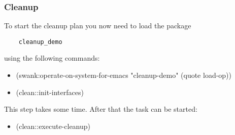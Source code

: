 \documentclass[main.tex]{subfiles}
\begin{document}
	\subsubsection{Cleanup}
	To start the cleanup plan you now need to load the package \begin{verbatim}
	cleanup_demo
	\end{verbatim}
	 using the following commands:
	\begin{itemize}
\item (swank:operate-on-system-for-emacs "cleanup-demo" (quote load-op))
\item (clean::init-interfaces)
\end{itemize}
This step takes some time. After that the task can be started:
\begin{itemize}
\item (clean::execute-cleanup)
\end{itemize}
\end{document}
